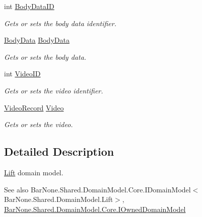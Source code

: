 \begin{DoxyCompactItemize}
int \mbox{\hyperlink{class_bar_none_1_1_shared_1_1_domain_model_1_1_lift_a9faca1495d817a4875c17a87e651aaa1}{Body\+Data\+ID}}
\begin{DoxyCompactList}\small\item\em Gets or sets the body data identifier. \end{DoxyCompactList}\item 
\mbox{\hyperlink{class_bar_none_1_1_shared_1_1_domain_model_1_1_body_data}{Body\+Data}} \mbox{\hyperlink{class_bar_none_1_1_shared_1_1_domain_model_1_1_lift_ad1e26f8bfe4f44a6a434f13b56f5bde1}{Body\+Data}}
\begin{DoxyCompactList}\small\item\em Gets or sets the body data. \end{DoxyCompactList}\item 
int \mbox{\hyperlink{class_bar_none_1_1_shared_1_1_domain_model_1_1_lift_a17745b36465e201c64cbc3d4b3143244}{Video\+ID}}
\begin{DoxyCompactList}\small\item\em Gets or sets the video identifier. \end{DoxyCompactList}\item 
\mbox{\hyperlink{class_bar_none_1_1_shared_1_1_domain_model_1_1_video_record}{Video\+Record}} \mbox{\hyperlink{class_bar_none_1_1_shared_1_1_domain_model_1_1_lift_a0fbd0472742a5481174637e118f9adf0}{Video}}
\begin{DoxyCompactList}\small\item\em Gets or sets the video. \end{DoxyCompactList}\end{DoxyCompactItemize}


\subsection{Detailed Description}
\mbox{\hyperlink{class_bar_none_1_1_shared_1_1_domain_model_1_1_lift}{Lift}} domain model. 

\begin{DoxySeeAlso}{See also}
Bar\+None.\+Shared.\+Domain\+Model.\+Core.\+I\+Domain\+Model$<$\+Bar\+None.\+Shared.\+Domain\+Model.\+Lift$>$, \mbox{\hyperlink{interface_bar_none_1_1_shared_1_1_domain_model_1_1_core_1_1_i_owned_domain_model}{Bar\+None.\+Shared.\+Domain\+Model.\+Core.\+I\+Owned\+Domain\+Model}}


\end{DoxySeeAlso}


